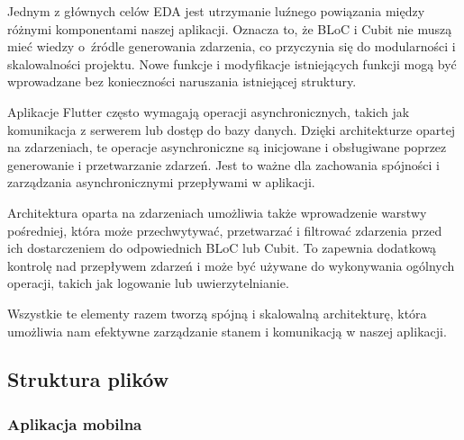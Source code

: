 \documentclass[a4paper,twoside,12pt]{book}
\begin{document}
Jednym z głównych celów EDA jest utrzymanie luźnego powiązania między różnymi komponentami naszej aplikacji. Oznacza to, że BLoC i Cubit nie muszą mieć wiedzy o~źródle generowania zdarzenia, co przyczynia się do modularności i skalowalności projektu. Nowe funkcje i modyfikacje istniejących funkcji mogą być wprowadzane bez konieczności naruszania istniejącej struktury.

Aplikacje Flutter często wymagają operacji asynchronicznych, takich jak komunikacja z serwerem lub dostęp do bazy danych. Dzięki architekturze opartej na zdarzeniach, te operacje asynchroniczne są inicjowane i obsługiwane poprzez generowanie i przetwarzanie zdarzeń. Jest to ważne dla zachowania spójności i zarządzania asynchronicznymi przepływami w aplikacji.

Architektura oparta na zdarzeniach umożliwia także wprowadzenie warstwy pośredniej, która może przechwytywać, przetwarzać i filtrować zdarzenia przed ich dostarczeniem do odpowiednich BLoC lub Cubit. To zapewnia dodatkową kontrolę nad przepływem zdarzeń i może być używane do wykonywania ogólnych operacji, takich jak logowanie lub uwierzytelnianie.

Wszystkie te elementy razem tworzą spójną i skalowalną architekturę, która umożliwia nam efektywne zarządzanie stanem i komunikacją w naszej aplikacji.

\subsection{Struktura plików}
\subsubsection{Aplikacja mobilna}
\end{document}
